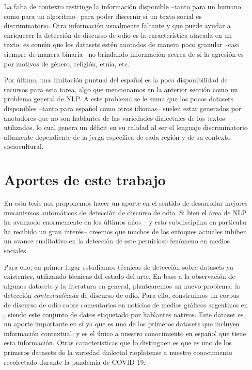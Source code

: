 La falta de contexto restringe la información disponible --tanto para un humano como para un algoritmo-- para poder discernir si un texto social es discriminatorio. Otra información usualmente faltante y que puede ayudar a enriquecer la detección de discurso de odio es la característica atacada en un texto: es común que los datasets estén anotados de manera poco granular --casi siempre de manera binaria-- no brindando información acerca de si la agresión es por motivos de género, religión, etnia, etc.

Por último, una limitación puntual del español es la poca disponibilidad de recursos para esta tarea, algo que mencionamos en la anterior sección como un problema general de NLP. A este problema se le suma que los pocos datasets disponibles --tanto para español como otros idiomas-- suelen estar generados por anotadores que no son hablantes de las variedades dialectales de los textos utilizados, lo cual genera un déficit en su calidad al ser el lenguaje discriminatorio altamente dependiente de la jerga específica de cada región y de su contexto sociocultural.


\section{Aportes de este trabajo}

En esta tesis nos proponemos hacer un aporte en el sentido de desarrollar mejores mecanismos automáticos de detección de discurso de odio. Si bien el área de NLP ha avanzado enormemente en los últimos años -- y esta subdisciplina en particular ha recibido un gran interés-- creemos que muchos de los enfoques actuales inhiben un avance cualitativo en la detección de este pernicioso fenómeno en medios sociales.

Para ello, en primer lugar estudiamos técnicas de detección sobre datasets ya existentes, utilizando técnicas del estado del arte. En base a la observación de algunos datasets y la literatura en general, plantearemos un nuevo problema: la detección \emph{contextualizada} de discurso de odio. Para ello, construimos un corpus de discurso de odio sobre comentarios en noticias de medios gráficos argentinos en \twitter{}, siendo este conjunto de datos etiquetado por hablantes nativos. Este dataset es un aporte importante en sí ya que es uno de los primeros datasets que incluyen información contextual, y es el único a nuestro conocimiento en español que tiene esta información. Otras características que lo distinguen es que es uno de los primeros datasets de la variedad dialectal rioplatense a nuestro conocimiento recolectado durante la pandemia de COVID-19.

